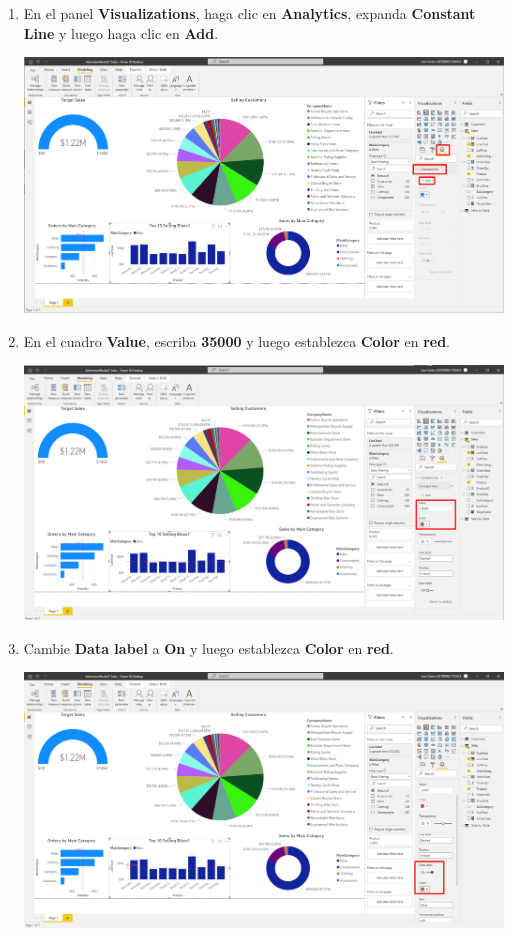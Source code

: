 \documentclass[12pt,letterpaper]{article}
\newcommand\tab[1][1cm]{\hspace*{#1}}
\begin{document}
\begin{enumerate}[\tab 1.]
\begin{center}
        \end{center}
        \item En el panel \textbf{Visualizations}, haga clic en \textbf{Analytics}, expanda \textbf{Constant Line} y luego haga clic en \textbf{Add}.
        \begin{center}
            \includegraphics[width=13cm]{./img/img114.png}
        \end{center}
        \item En el cuadro \textbf{Value}, escriba \textbf{35000} y luego establezca \textbf{Color} en \textbf{red}.
        \begin{center}
            \includegraphics[width=13cm]{./img/img115.png}
        \end{center}
        \item Cambie \textbf{Data label} a \textbf{On} y luego establezca \textbf{Color} en \textbf{red}.
        \begin{center}
            \includegraphics[width=13cm]{./img/img116.png}

\end{center}
\end{enumerate}
\end{document}
